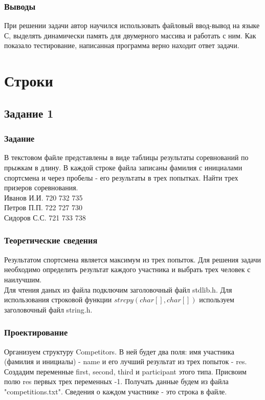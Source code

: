 \documentclass[12pt,a4paper]{report}
\begin{document}
\subsection{Выводы}
При решении задачи автор научился использовать файловый ввод-вывод на языке С, выделять динамически память для двумерного массива и работать с ним. Как показало тестирование, написанная программа верно находит ответ задачи. \\
\newpage

\chapter{Строки}
\section{Задание 1}
\subsection{Задание}
В текстовом файле представлены в виде таблицы результаты соревнований по прыжкам в длину. В каждой строке файла записаны фамилия с инициалами спортсмена и через пробелы - его результаты в трех попытках. Найти трех призеров соревнования. \\
Иванов И.И. 720 732 735 \\
Петров П.П. 722 727 730 \\
Сидоров С.С. 721 733 738 \\
\subsection{Теоретические сведения}
Результатом спортсмена является максимум из трех попыток. Для решения задачи необходимо определить результат каждого участника и выбрать трех человек с наилучшим. \\
Для чтения даных из файла подключим заголовочный файл stdlib.h. Для использования строковой функции $strcpy(char[], char[])$ используем заголовочный файл string.h. 
\subsection{Проектирование}
Организуем структуру Competitors. В ней будет два поля: имя участника (фамилия и инициалы) - name и его лучший результат из трех попыток - res. Создадим переменные first, second, third и participant этого типа. Присвоим полю res первых трех переменных -1. Получать данные будем из файла "competitions.txt". Сведения о каждом участнике - это строка в файле. \\
\end{document}
